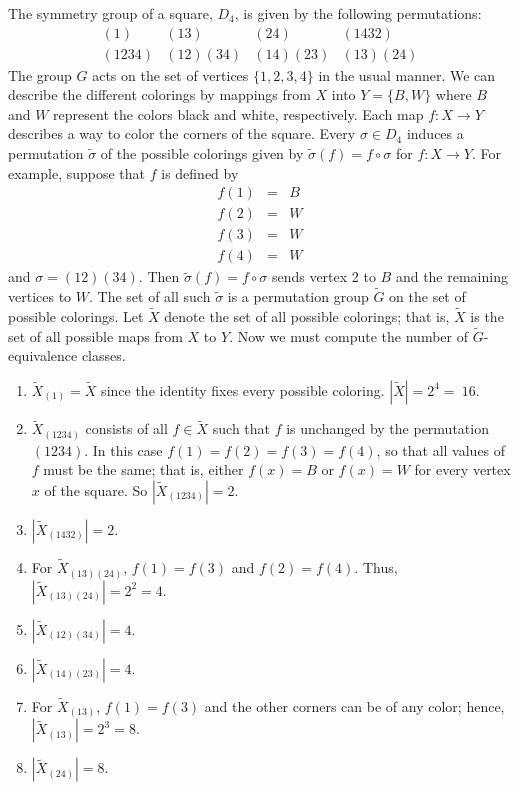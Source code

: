  
The  symmetry group of a square, $D_4$, is given by the following
permutations: 
$$
\begin{array}{cccc}
(1)    & (13)     & (24)     & (1432) \\
(1234) & (12)(34) & (14)(23) & (13)(24)
\end{array}
$$
The group $G$ acts on the set of vertices $\{ 1, 2, 3, 4\}$ in the
usual manner. We can describe the different colorings by mappings from
$X$ into $Y = \{ B, W \}$ where $B$ and $W$ represent the colors black
and white, respectively. Each map $f : X \rightarrow Y$ describes a
way to color the corners of the square. Every $\sigma \in D_4$ induces
a permutation $\widetilde{ \sigma }$ of the possible colorings given
by $\widetilde{\sigma}(f) = f \circ \sigma$ for $f : X \rightarrow Y$.
For example, suppose that $f$ is defined by 
\begin{eqnarray*}
f(1) & = & B \\
f(2) & = & W \\
f(3) & = & W \\
f(4) & = & W
\end{eqnarray*}
and $\sigma = (1 2)(3 4)$. Then $\widetilde{\sigma}(f) = f \circ
\sigma$ sends vertex 2 to $B$ and the remaining vertices to $W$. The
set of all such $\widetilde{\sigma}$ is a permutation group
$\widetilde{G}$ on the set of possible colorings. Let $\widetilde{X}$
denote the set of all possible colorings; that is, $\widetilde{X}$ is
the set of all possible maps from $X$ to $Y$.  Now we must compute the
number of $\widetilde{G}$-equivalence classes. 
\begin{enumerate}
 
\item
$\widetilde{X}_{(1)} = \widetilde{X}$ since the identity fixes every
possible coloring. $|\widetilde{X}| = 2^4 =~16$.
 
\item
$\widetilde{X}_{(1 2 3 4)}$ consists of all $f \in \widetilde{X}$ such
that $f$ is unchanged by the permutation $(1 23 4)$. In this case
$f(1) = f(2) = f(3) = f(4)$, so that all values of $f$ must be the 
same; that is, either $f(x)= B$ or $f(x)= W$ for every vertex $x$ of 
the square. So $|\widetilde{X}_{(1 2 3 4)}| = 2$.
 
\item 
$|\widetilde{X}_{(1 4 3 2)}| = 2$.
 
\item 
For $\widetilde{X}_{(1 3)(2 4)}$, $f(1) = f(3)$ and $f(2) =
f(4)$. Thus, $|\widetilde{X}_{(13)(24)}| = 2^2 = 4$.
 
\item 
$|\widetilde{X}_{(1 2)(3 4)}| = 4$.
 
\item 
$|\widetilde{X}_{(1 4)(2 3)}| = 4$.
 
\item 
For $\widetilde{X}_{(1  3 )}$, $f(1) = f(3)$ and the other corners can
be of any color; hence, $|\widetilde{X}_{(1 3)}| = 2^3 = 8$.
 
\item 
$|\widetilde{X}_{(2 4)}| = 8$.
 
\end{enumerate}
